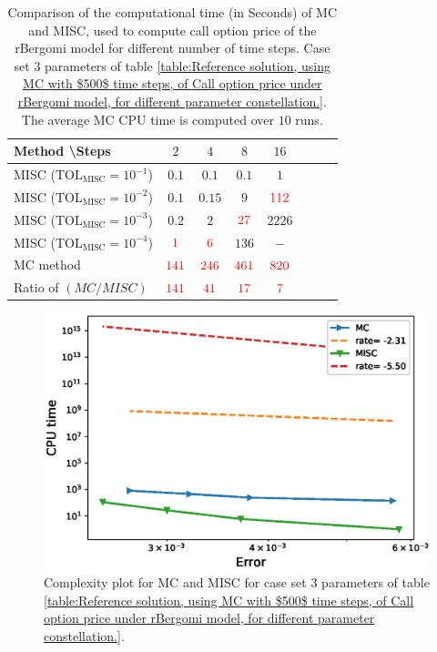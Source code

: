 \FloatBarrier
\begin{table}[h!]
	\centering
	\begin{tabular}{l*{6}{c}r}
		Method \textbackslash  Steps            & $2$ & $4$ & $8$ & $16$ &   \\
		\hline
		MISC ($\text{TOL}_{\text{MISC}}=10^{-1}$)  & $0.1$ & $0.1$ & $0.1$ & $1$ \\
		MISC ($\text{TOL}_{\text{MISC}}=10^{-2}$)  & $0.1$ & $0.15$ & $9$ & $\red{112}$ \\
		MISC ($\text{TOL}_{\text{MISC}}=10^{-3}$)  & $0.2$ & $2$ & $\red{27}$ & $2226$ \\
		MISC ($\text{TOL}_{\text{MISC}}=10^{-4}$)  & $\red{1}$ & $\red{6}$ & $136$ & $-$\\
		\hline
		MC method   & $ \red{141}
		
		$  & $  \red{246}$  & $  \red{461}$ & $ \red{820}
		$  \\	
		\hline
		Ratio of $\left(MC/MISC \right)$ & $ \red{141}
		
		$  & $  \red{
			41
		}$  & $  \red{    17
		}$ & $ \red{ 7}
		$  \\	
%		
		\hline
	\end{tabular}
	\caption{Comparison of the computational time (in Seconds) of  MC and MISC, used to compute call option price of the rBergomi model for different number of time steps. Case set $3$ parameters of table \ref{table:Reference solution, using MC with $500$ time steps, of Call option price under rBergomi model, for different parameter constellation.}. The average  MC CPU time is computed over $10$ runs. }
	\label{Comparsion of the computational time of  MC and MISC, used to compute Call option price of rBergomi model for different number of time steps. Case set4}
\end{table}


\FloatBarrier

	\begin{figure}[h!]
	\centering
	\includegraphics[width=0.35\linewidth]{./figures/rBergomi_Complexity_rates/set6/error_vs_time_set6}
	
	\caption{Complexity plot for   MC and MISC for case set $3$ parameters of table \ref{table:Reference solution, using MC with $500$ time steps, of Call option price under rBergomi model, for different parameter constellation.}.}
	\label{fig:Complexity plot for MC and MISC for case set $4$ parameters}
\end{figure}
\FloatBarrier
